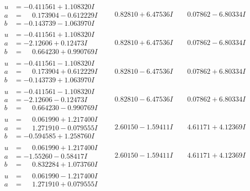 \documentclass[1p]{elsarticle_modified}
\theoremstyle{definition}
\begin{document}
$$\begin{array}{c|c|c}
\begin{aligned}
u &= -0.411561 + 1.108320 I \\
a &= \phantom{-}0.173904 - 0.612229 I \\
b &= -0.143739 - 1.063970 I\end{aligned}
 & \phantom{-}0.82810 + 6.47536 I & \phantom{-}0.07862 - 6.80334 I \\ \hline\begin{aligned}
u &= -0.411561 + 1.108320 I \\
a &= -2.12606 + 0.12473 I \\
b &= \phantom{-}0.664230 + 0.990769 I\end{aligned}
 & \phantom{-}0.82810 + 6.47536 I & \phantom{-}0.07862 - 6.80334 I \\ \hline\begin{aligned}
u &= -0.411561 - 1.108320 I \\
a &= \phantom{-}0.173904 + 0.612229 I \\
b &= -0.143739 + 1.063970 I\end{aligned}
 & \phantom{-}0.82810 - 6.47536 I & \phantom{-}0.07862 + 6.80334 I \\ \hline\begin{aligned}
u &= -0.411561 - 1.108320 I \\
a &= -2.12606 - 0.12473 I \\
b &= \phantom{-}0.664230 - 0.990769 I\end{aligned}
 & \phantom{-}0.82810 - 6.47536 I & \phantom{-}0.07862 + 6.80334 I \\ \hline\begin{aligned}
u &= \phantom{-}0.061990 + 1.217400 I \\
a &= \phantom{-}1.271910 - 0.079555 I \\
b &= -0.594585 + 1.258760 I\end{aligned}
 & \phantom{-}2.60150 - 1.59411 I & \phantom{-}4.61171 + 4.12369 I \\ \hline\begin{aligned}
u &= \phantom{-}0.061990 + 1.217400 I \\
a &= -1.55260 - 0.58417 I \\
b &= \phantom{-}0.832284 + 1.073760 I\end{aligned}
 & \phantom{-}2.60150 - 1.59411 I & \phantom{-}4.61171 + 4.12369 I \\ \hline\begin{aligned}
u &= \phantom{-}0.061990 - 1.217400 I \\
a &= \phantom{-}1.271910 + 0.079555 I \\

\end{aligned}
\end{array}$$
\end{document}
